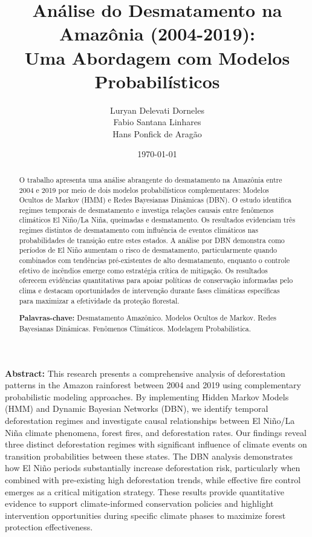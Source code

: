 \documentclass[12pt,a4paper]{article}
\title{\textbf{Análise do Desmatamento na Amazônia (2004-2019): \\Uma Abordagem com Modelos Probabilísticos}}
\author{Luryan Delevati Dorneles \\ Fabio Santana Linhares \\ Hans Ponfick de Aragão}
\date{\today}
\begin{document}
\maketitle

\begin{abstract}
O trabalho apresenta uma análise abrangente do desmatamento na Amazônia entre 2004 e 2019 por meio de dois modelos probabilísticos complementares: Modelos Ocultos de Markov (HMM) e Redes Bayesianas Dinâmicas (DBN). O estudo identifica regimes temporais de desmatamento e investiga relações causais entre fenômenos climáticos El Niño/La Niña, queimadas e desmatamento. Os resultados evidenciam três regimes distintos de desmatamento com influência de eventos climáticos nas probabilidades de transição entre estes estados. A análise por DBN demonstra como períodos de El Niño aumentam o risco de desmatamento, particularmente quando combinados com tendências pré-existentes de alto desmatamento, enquanto o controle efetivo de incêndios emerge como estratégia crítica de mitigação. Os resultados oferecem evidências quantitativas para apoiar políticas de conservação informadas pelo clima e destacam oportunidades de intervenção durante fases climáticas específicas para maximizar a efetividade da proteção florestal.

\bigskip
\noindent
\textbf{Palavras-chave:} Desmatamento Amazônico. Modelos Ocultos de Markov. Redes Bayesianas Dinâmicas. Fenômenos Climáticos. Modelagem Probabilística.
\end{abstract}

\bigskip

\bigskip

\noindent\textbf{Abstract:} 
This research presents a comprehensive analysis of deforestation patterns in the Amazon rainforest between 2004 and 2019 using complementary probabilistic modeling approaches. By implementing Hidden Markov Models (HMM) and Dynamic Bayesian Networks (DBN), we identify temporal deforestation regimes and investigate causal relationships between El Niño/La Niña climate phenomena, forest fires, and deforestation rates. Our findings reveal three distinct deforestation regimes with significant influence of climate events on transition probabilities between these states. The DBN analysis demonstrates how El Niño periods substantially increase deforestation risk, particularly when combined with pre-existing high deforestation trends, while effective fire control emerges as a critical mitigation strategy. These results provide quantitative evidence to support climate-informed conservation policies and highlight intervention opportunities during specific climate phases to maximize forest protection effectiveness.
\end{document}
